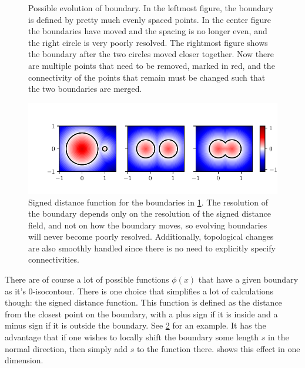 \begin{figure}[htpb]
	\centering
	
	\caption{%
		Possible evolution of boundary. In the leftmost figure, the
		boundary is defined by pretty much evenly spaced points. In the center figure
		the boundaries have moved and the spacing is no longer even, and the
		right circle is very poorly resolved.
		The rightmost figure shows the boundary after the two circles moved
		closer together. Now there are multiple points that need to be removed,
		marked in red, and the connectivity of the points that remain must be
		changed such that the two boundaries are merged.
	}%
	\label{fig:direct_troubles}
\end{figure}
\begin{figure}[htpb]
	\centering
	\includegraphics{chapters/methods/signed_dist_example.pdf}
	\caption{%
		Signed distance function for the boundaries in
		\cref{fig:direct_troubles}. The resolution of the boundary depends only
		on the resolution of the signed distance field, and not on how the
		boundary moves, so evolving boundaries will never become poorly
		resolved. Additionally,
		topological changes are also smoothly handled since there is no need to
		explicitly specify connectivities.
	}%
	\label{fig:signed_dist_example}
\end{figure}

There are of course a lot of possible functions $\phi(x)$ that have a given
boundary as it's 0-isocontour.
There is one choice that simplifies a lot of calculations though: the signed
distance function.
This function is defined as the distance from the closest point on the boundary,
with a plus sign if it is inside and a minus sign if it is outside the boundary.
See \cref{fig:signed_dist_example} for an example.
It has the advantage that if one wishes to locally shift the boundary some
length $s$ in the normal direction, then simply add $s$ to the function there.
 shows this effect in one dimension.

